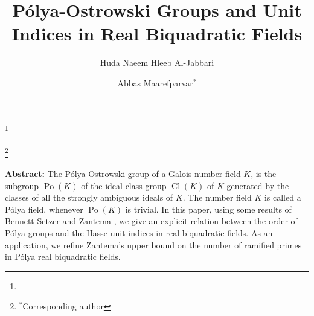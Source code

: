 \documentclass{jams-l}
\theoremstyle{definition}
\theoremstyle{remark}
\numberwithin{equation}{section}
\DeclareMathOperator{\Po}{Po}
\DeclareMathOperator{\Cl}{Cl}
\begin{document}
\title[P\'olya-Ostrowski Groups and Unit Indices in Real Biquadratic Fields]{
P\'olya-Ostrowski Groups and Unit Indices in Real Biquadratic Fields}


\author{Huda Naeem Hleeb Al-Jabbari}
\address{Department of Mathematics, Tarbiat Modares University, 14115-134, Tehran, Iran}
\curraddr{} 
\thanks{}


\author{Abbas Maarefparvar$^{*}$}
\address{Department of Mathematics and Computer Science, University of Lethbridge, Lethbridge, Canada}
\curraddr{}
\thanks{$^{*}$Corresponding author}
\date{}
\dedicatory{}
\commby{}

\commby{}
\maketitle







{\noindent \bf{Abstract:}}
The P\'olya-Ostrowski group of a Galois number field $K$, is the subgroup $\Po(K)$ of the ideal class group $\Cl(K)$ of $K$ generated by the classes of  all the strongly ambiguous ideals of $K$. The number field $K$ is called a P\'olya field, whenever $\Po(K)$ is trivial. In this paper, using  some results of Bennett Setzer \cite{Bennett} and Zantema \cite{Zantema}, we  give an explicit relation between the order of P\'olya groups and the Hasse unit indices in real biquadratic fields. 
As an application, we refine Zantema's upper bound on the number of ramified primes in  P\'olya real biquadratic fields.
\end{document}
